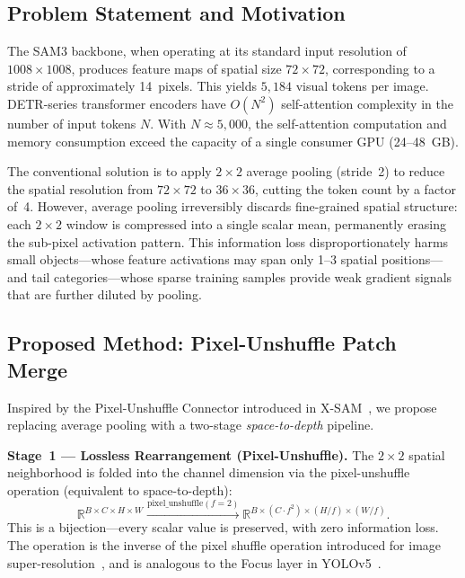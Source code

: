 \subsection{Problem Statement and Motivation}

The SAM3 backbone, when operating at its standard input resolution of $1008 \times 1008$, produces feature maps of spatial size $72 \times 72$, corresponding to a stride of approximately 14~pixels. This yields $5{,}184$ visual tokens per image. DETR-series transformer encoders have $O(N^2)$ self-attention complexity in the number of input tokens $N$. With $N \approx 5{,}000$, the self-attention computation and memory consumption exceed the capacity of a single consumer GPU (24--48~GB).

The conventional solution is to apply $2 \times 2$ average pooling (stride~2) to reduce the spatial resolution from $72 \times 72$ to $36 \times 36$, cutting the token count by a factor of~4. However, average pooling irreversibly discards fine-grained spatial structure: each $2 \times 2$ window is compressed into a single scalar mean, permanently erasing the sub-pixel activation pattern. This information loss disproportionately harms small objects---whose feature activations may span only 1--3 spatial positions---and tail categories---whose sparse training samples provide weak gradient signals that are further diluted by pooling.

\subsection{Proposed Method: Pixel-Unshuffle Patch Merge}

Inspired by the Pixel-Unshuffle Connector introduced in X-SAM~\cite{xsam2026}, we propose replacing average pooling with a two-stage \textit{space-to-depth} pipeline.

\textbf{Stage~1 --- Lossless Rearrangement (Pixel-Unshuffle).}
The $2 \times 2$ spatial neighborhood is folded into the channel dimension via the pixel-unshuffle operation (equivalent to space-to-depth):
\begin{equation}
\mathbb{R}^{B \times C \times H \times W} \xrightarrow{\mathrm{pixel\_unshuffle}(f=2)} \mathbb{R}^{B \times (C \cdot f^2) \times (H/f) \times (W/f)}.
\end{equation}
This is a bijection---every scalar value is preserved, with zero information loss. The operation is the inverse of the pixel shuffle operation introduced for image super-resolution~\cite{shi2016real}, and is analogous to the Focus layer in YOLOv5~\cite{ultralytics2020yolov5}.

